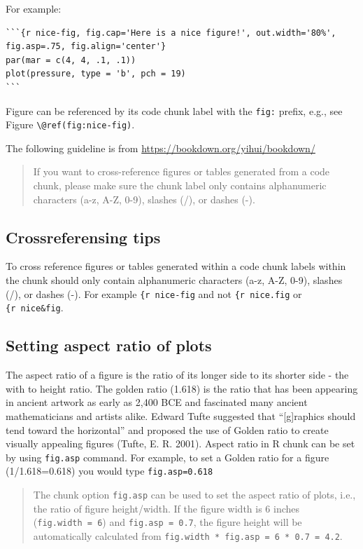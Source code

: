 \documentclass[]{book}
\begin{document}
For example:

\begin{verbatim}
```{r nice-fig, fig.cap='Here is a nice figure!', out.width='80%',
fig.asp=.75, fig.align='center'}
par(mar = c(4, 4, .1, .1))
plot(pressure, type = 'b', pch = 19)
```
\end{verbatim}

Figure can be referenced by its code chunk label with the \texttt{fig:}
prefix, e.g., see Figure \texttt{\textbackslash{}@ref(fig:nice-fig)}.

The following guideline is from
\url{https://bookdown.org/yihui/bookdown/}

\begin{quote}
If you want to cross-reference figures or tables generated from a code
chunk, please make sure the chunk label only contains alphanumeric
characters (a-z, A-Z, 0-9), slashes (/), or dashes (-).
\end{quote}

\subsection{Crossreferensing tips}\label{crossreferensing-tips}

To cross reference figures or tables generated within a code chunk
labels within the chunk should only contain alphanumeric characters
(a-z, A-Z, 0-9), slashes (/), or dashes (-). For example
\texttt{\{r\ nice-fig} and not \texttt{\{r\ nice.fig} or
\texttt{\{r\ nice\&fig}.

\subsection{Setting aspect ratio of
plots}\label{setting-aspect-ratio-of-plots}

The aspect ratio of a figure is the ratio of its longer side to its
shorter side - the with to height ratio. The golden ratio (1.618) is the
ratio that has been appearing in ancient artwork as early as 2,400 BCE
and fascinated many ancient mathematicians and artists alike. Edward
Tufte suggested that ``{[}g{]}raphics should tend toward the
horizontal'' and proposed the use of Golden ratio to create visually
appealing figures (Tufte, E. R. 2001). Aspect ratio in R chunk can be
set by using \texttt{fig.asp} command. For example, to set a Golden
ratio for a figure (1/1.618=0.618) you would type \texttt{fig.asp=0.618}

\begin{quote}
The chunk option \texttt{fig.asp} can be used to set the aspect ratio of
plots, i.e., the ratio of figure height/width. If the figure width is 6
inches (\texttt{fig.width\ =\ 6}) and \texttt{fig.asp\ =\ 0.7}, the
figure height will be automatically calculated from
\texttt{fig.width\ *\ fig.asp\ =\ 6\ *\ 0.7\ =\ 4.2}.
\end{quote}
\end{document}
